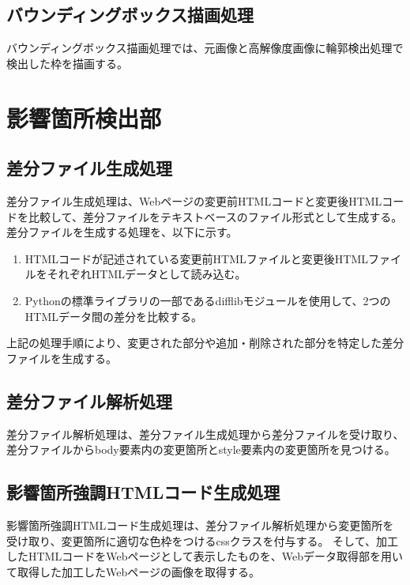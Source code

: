 \subsection{バウンディングボックス描画処理}\label{subsec:Bounding box drawing process}
バウンディングボックス描画処理では、元画像と高解像度画像に輪郭検出処理で検出した枠を描画する。


\section{影響箇所検出部}\label{sec:Affected_area_extraction}

\subsection{差分ファイル生成処理}\label{subsec:diff_file_generate}
差分ファイル生成処理は、Webページの変更前HTMLコードと変更後HTMLコードを比較して、差分ファイルをテキストベースのファイル形式として生成する。
差分ファイルを生成する処理を、以下に示す。
\begin{enumerate}
    \item HTMLコードが記述されている変更前HTMLファイルと変更後HTMLファイルをそれぞれHTMLデータとして読み込む。
    \item Pythonの標準ライブラリの一部であるdifflibモジュールを使用して、2つのHTMLデータ間の差分を比較する。
\end{enumerate}
上記の処理手順により、変更された部分や追加・削除された部分を特定した差分ファイルを生成する。

\subsection{差分ファイル解析処理}\label{subsec:diff_file_analyze}
差分ファイル解析処理は、差分ファイル生成処理から差分ファイルを受け取り、差分ファイルからbody要素内の変更箇所とstyle要素内の変更箇所を見つける。

\subsection{影響箇所強調HTMLコード生成処理}\label{subsec:modified_html_generate}
影響箇所強調HTMLコード生成処理は、差分ファイル解析処理から変更箇所を受け取り、変更箇所に適切な色枠をつけるcssクラスを付与する。
そして、加工したHTMLコードをWebページとして表示したものを、Webデータ取得部を用いて取得した加工したWebページの画像を取得する。

